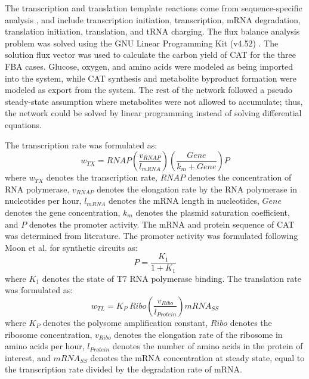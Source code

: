 \documentclass[12pt]{article}
\begin{document}
The transcription and translation template reactions come from sequence-specific analysis \cite{Allen:2003aa}, and include transcription initiation, transcription, mRNA degradation, translation initiation, translation, and tRNA charging.
The flux balance analysis problem was solved using the GNU Linear Programming Kit (v4.52) \cite{GLPK}.
The solution flux vector was used to calculate the carbon yield of CAT for the three FBA cases.
Glucose, oxygen, and amino acids were modeled as being imported into the system, while CAT synthesis and metabolite byproduct formation were modeled as export from the system.
The rest of the network followed a pseudo steady-state assumption where metabolites were not allowed to accumulate; thus, the network could be solved by linear programming instead of solving differential equations.

The transcription rate was formulated as:
\begin{equation}\nonumber
	w_{TX} = RNAP\left(\frac{v_{RNAP}}{l_{mRNA}}\right)\left(\frac{Gene}{k_m+Gene}\right)P
\end{equation}
where $w_{TX}$ denotes the transcription rate, $RNAP$ denotes the concentration of RNA polymerase, $v_{RNAP}$ denotes the elongation rate by the RNA polymerase in nucleotides per hour, $l_{mRNA}$ denotes the mRNA length in nucleotides, $Gene$ denotes the gene concentration, $k_m$ denotes the plasmid saturation coefficient, and $P$ denotes the promoter activity.
The mRNA and protein sequence of CAT was determined from literature.
The promoter activity was formulated following Moon et al. for synthetic circuits as:
\begin{equation}\nonumber
	P = \frac{K_{1}}{1 + K_{1}}
\end{equation}
where $K_{1}$ denotes the state of T7 RNA polymerase binding.
The translation rate was formulated as:
 \begin{equation}\nonumber
	w_{TL} = K_{P}\ Ribo\left(\frac{v_{Ribo}}{l_{Protein}}\right)mRNA_{SS}
\end{equation}
where $K_{P}$ denotes the polysome amplification constant, $Ribo$ denotes the ribosome concentration, $v_{Ribo}$ denotes the elongation rate of the ribosome in amino acids per hour, $l_{Protein}$ denotes the number of amino acids in the protein of interest, and $mRNA_{SS}$ denotes the mRNA concentration at steady state, equal to the transcription rate divided by the degradation rate of mRNA.
\end{document}
